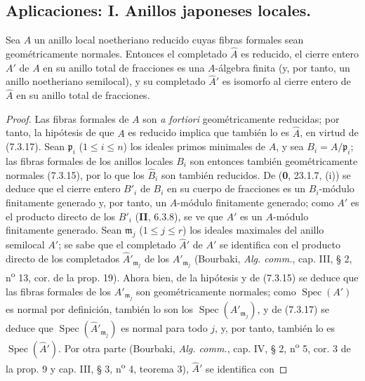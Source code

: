 \subsection{Aplicaciones: I. Anillos japoneses locales.}
\label{IV.2.ss7.6-fr}

\begin{proposition}[7.6.1]
\label{IV.2.s7.6.1-fr}
Sea $A$ un anillo local noetheriano reducido cuyas fibras formales sean
geométricamente normales. Entonces el completado $\widehat A$ es reducido,
el cierre entero $A'$ de $A$ en su anillo total de fracciones es una
$A$-álgebra finita (y, por tanto, un anillo noetheriano semilocal), y su
completado $\widehat{A}'$ es isomorfo al cierre entero de $\widehat A$ en su
anillo total de fracciones.
\end{proposition}

\begin{proof}
Las fibras formales de $A$ son \emph{a fortiori} geométricamente reducidas;
por tanto, la hipótesis de que $A$ es reducido implica que también lo es
$\widehat A$, en virtud de (7.3.17). Sean $\mathfrak p_i$
($1\leq i\leq n$) los ideales primos minimales de $A$, y sea
$B_i=A/\mathfrak p_i$; las fibras formales de los anillos locales $B_i$
son entonces también geométricamente normales (7.3.15), por lo que los
$\widehat B_i$ son también reducidos. De (\textbf 0, 23.1.7, (i)) se deduce que
el cierre entero $B'_i$ de $B_i$ en su cuerpo de fracciones es un
$B_i$-módulo finitamente generado y, por tanto, un $A$-módulo finitamente
generado; como $A'$ es el producto directo de los $B'_i$ (\textbf{II}, 6.3.8),
se ve que $A'$ es un $A$-módulo finitamente generado. Sean
$\mathfrak m_j$ ($1\leq j\leq r$) los ideales maximales del anillo
semilocal $A'$; se sabe que el completado $\widehat{A}'$ de $A'$ se
identifica con el producto directo de los completados
$\widehat{A}'_{\mathfrak m_j}$ de los $A'_{\mathfrak m_j}$ (Bourbaki,
\emph{Alg. comm.}, cap. III, § 2, n\textsuperscript{o} 13, cor. de la prop. 19).
Ahora bien, de la hipótesis y de (7.3.15) se deduce que las fibras formales
de los $A'_{\mathfrak m_j}$ son geométricamente normales; como
$\operatorname{Spec}(A')$ es normal por definición, también lo son los
$\operatorname{Spec}(A'_{\mathfrak m_j})$, y de (7.3.17) se deduce que
$\operatorname{Spec}(\widehat{A}'_{\mathfrak m_j})$ es normal para todo $j$,
y, por tanto, también lo es $\operatorname{Spec}(\widehat{A}')$.
Por otra parte (Bourbaki, \emph{Alg. comm.}, cap. IV, § 2,
n\textsuperscript{o} 5, cor. 3 de la prop. 9 y cap. III, § 3,
n\textsuperscript{o} 4, teorema 3), $\widehat{A}'$ se identifica con

\end{proof}
